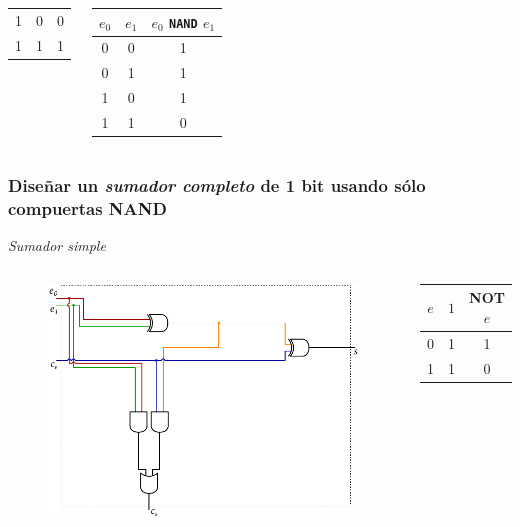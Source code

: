 \documentclass[mathserif,hyperref]{beamer}
\begin{document}
\begin{frame}[t]
\begin{columns}[T]
\begin{center}
\begin{tabular}{| c | c || c |}
      1   &   0   &             0            \\
      1   &   1   &             1            \\
    \hline
  \end{tabular}\end{center}
  \pause
  \begin{center}\begin{tabular}{| c | c || c |}
    \hline
    $e_0$ & $e_1$ & $e_0$ \texttt{NAND} $e_1$ \\ \hline
      0   &   0   &              1            \\
      0   &   1   &              1            \\
      1   &   0   &              1            \\
      1   &   1   &              0            \\
    \hline
  \end{tabular}\end{center}
\end{columns}
\end{frame}


\begin{frame}[t]
\frametitle{\small Diseñar un \textit{sumador completo} de 1 bit usando sólo
compuertas NAND}
\textit{Sumador simple}
\begin{columns}[T]
  \begin{figure}[htp]
    \includegraphics[scale=0.6]{sumador-completo.pdf}
  \end{figure}
  \begin{center}\begin{tabular}{| c | c || c |}
    \hline
    $e$ & $1$ & NOT $e$ \\ \hline
     0  &  1  &    1    \\
     1  &  1  &    0    \\
    \hline
  \end{tabular}\end{center}
\end{columns}
\end{frame}
\end{document}

